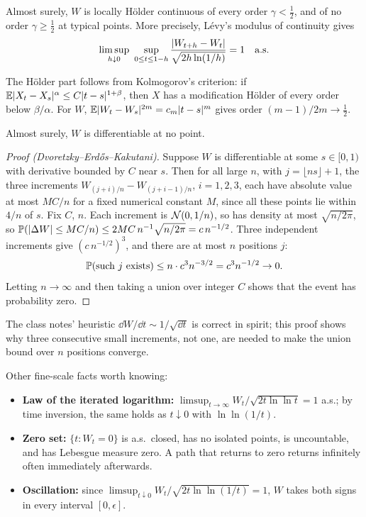 \begin{theorem}\label{thm:holder}
Almost surely, $W$ is locally H\"older continuous of every order $\gamma<\tfrac12$, and of no order $\gamma\ge\tfrac12$ at typical points. More precisely, L\'evy's modulus of continuity gives
\[
\limsup_{h\downarrow0}\ \sup_{0\le t\le1-h}\frac{|W_{t+h}-W_t|}{\sqrt{2h\ln(1/h)}}=1\quad\text{a.s.}
\]
\end{theorem}

The H\"older part follows from Kolmogorov's criterion: if $\mathbb{E}|X_t-X_s|^\alpha\le C|t-s|^{1+\beta}$, then $X$ has a modification H\"older of every order below $\beta/\alpha$. For $W$, $\mathbb{E}|W_t-W_s|^{2m}=c_m|t-s|^m$ gives order $(m-1)/2m\to\tfrac12$.

\begin{theorem}\label{thm:nowhere}
Almost surely, $W$ is differentiable at no point.
\end{theorem}
\begin{proof}[Proof (Dvoretzky--Erd\H{o}s--Kakutani)]
Suppose $W$ is differentiable at some $s\in[0,1)$ with derivative bounded by $C$ near $s$. Then for all large $n$, with $j=\lfloor ns\rfloor+1$, the three increments $W_{(j+i)/n}-W_{(j+i-1)/n}$, $i=1,2,3$, each have absolute value at most $MC/n$ for a fixed numerical constant $M$, since all these points lie within $4/n$ of $s$. Fix $C$, $n$. Each increment is $\mathcal{N}(0,1/n)$, so has density at most $\sqrt{n/2\pi}$, so
$\mathbb{P}(|\Delta W|\le MC/n)\le 2MC\,n^{-1}\sqrt{n/2\pi}=c\,n^{-1/2}$.
Three independent increments give $(c\,n^{-1/2})^3$, and there are at most $n$ positions $j$:
\[
\mathbb{P}(\text{such }j\text{ exists})\le n\cdot c^3n^{-3/2}=c^3n^{-1/2}\to0.
\]
Letting $n\to\infty$ and then taking a union over integer $C$ shows that the event has probability zero.
\end{proof}

The class notes' heuristic $\dd W/\dd t\sim1/\sqrt{\dd t}$ is correct in spirit; this proof shows why three consecutive small increments, not one, are needed to make the union bound over $n$ positions converge.

Other fine-scale facts worth knowing:
\begin{itemize}
\item \textbf{Law of the iterated logarithm:} $\limsup_{t\to\infty}W_t/\sqrt{2t\ln\ln t}=1$ a.s.; by time inversion, the same holds as $t\downarrow0$ with $\ln\ln(1/t)$.
\item \textbf{Zero set:} $\{t:W_t=0\}$ is a.s.\ closed, has no isolated points, is uncountable, and has Lebesgue measure zero. A path that returns to zero returns infinitely often immediately afterwards.
\item \textbf{Oscillation:} since $\limsup_{t\downarrow0}W_t/\sqrt{2t\ln\ln(1/t)}=1$, $W$ takes both signs in every interval $[0,\epsilon]$.
\end{itemize}

